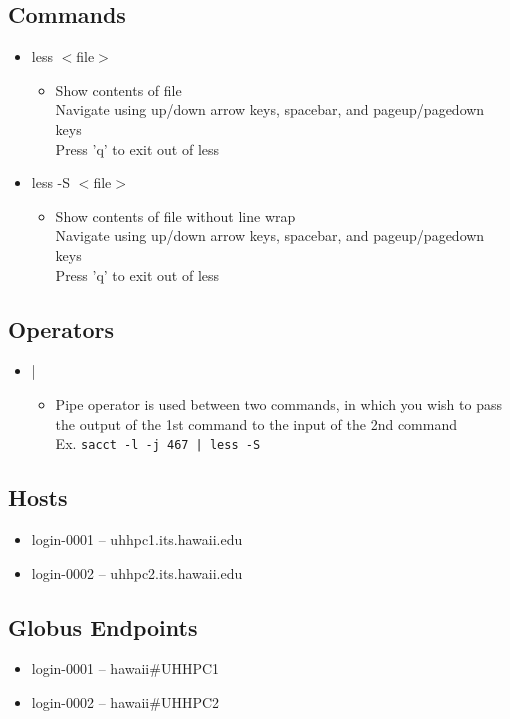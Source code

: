 \documentclass[11pt,twocolumn]{article}
\newcommand{\lft}{$<$}
\newcommand{\rht}{$>$}
\newcommand{\pth}[1]{{\lft}#1{\rht}}
\newcommand{\desc}[1]{\small \begin{itemize}\item[]#1\end{itemize}}
\begin{document}
\subsection{Commands}
\begin{itemize}
\item[] less \pth{file} \desc{Show contents of file\\Navigate using up/down arrow keys, spacebar, and pageup/pagedown keys\\  Press 'q' to exit out of less}
\item[] less -S \pth{file} \desc{Show contents of file without line wrap\\Navigate using up/down arrow keys, spacebar, and pageup/pagedown keys\\Press 'q' to exit out of less}

\end{itemize}


\subsection{Operators}
\begin{itemize}
\item[] | \desc{Pipe operator is used between two commands, in which you wish to pass the output of the 1st command to the input of the 2nd command\\Ex. \texttt{sacct -l -j 467 | less -S }}
\end{itemize}

\subsection{Hosts}
\begin{itemize}
\item[] login-0001 -- uhhpc1.its.hawaii.edu
\item[] login-0002 -- uhhpc2.its.hawaii.edu
\end{itemize}

\subsection{Globus Endpoints}
\begin{itemize}
\item[] login-0001 -- hawaii#UHHPC1
\item[] login-0002 -- hawaii#UHHPC2
\end{itemize}
\end{document}
